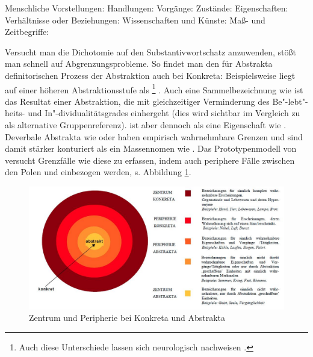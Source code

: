 \begin{exe}
	\ex \label{ex:abstrakta}
	\begin{xlist}
		\ex \label{ex:vorstellung} Menschliche Vorstellungen: 
		\ex \label{ex:handlungen} Handlungen: 
		\ex \label{ex:vorgang} Vorgänge: 
		\ex \label{ex:zustand} Zustände: 
		\ex \label{ex:eigenschaft} Eigenschaften: 
		\ex \label{ex:verhaeltnise} Verhältnisse oder Beziehungen: 
		\ex \label{ex:wissenschaft} Wissenschaften und Künste: 
		\ex \label{ex:zeit} Maß- und Zeitbegriffe: 
	\end{xlist}
\end{exe} 

Versucht man die Dichotomie  auf den Substantivwortschatz anzuwenden, stößt man schnell auf Abgrenzungsprobleme. So findet man den für Abstrakta definitorischen Prozess der Abstraktion auch bei Konkreta: Beispielsweise liegt  auf einer höheren Abstraktionsstufe als \footnote{Auch diese Unterschiede lassen sich neurologisch nachweisen \parencite[s.][]{Ghio2013}.} \parencite[274]{Ewald1992}. Auch eine Sammelbezeichnung wie  ist das Resultat einer Abstraktion, die mit gleichzeitiger Verminderung des Be"-lebt"-heits- und In"-dividualitätsgrades einhergeht (dies wird sichtbar im Vergleich zu  als alternative Gruppenreferenz).  ist aber dennoch  als eine Eigenschaft wie . Deverbale Abstrakta wie  oder  haben empirisch wahrnehmbare Grenzen und sind damit stärker konturiert als ein Massennomen wie . Das Prototypenmodell von \textcite[279f.]{Ewald1992} versucht Grenzfälle wie diese zu erfassen, indem auch periphere Fälle zwischen den Polen  und  einbezogen werden, s. Abbildung \ref{abb:schrauf-ewald}. 

\begin{figure}[h]
\begin{center}
\includegraphics[width=12cm]{images/schrauff-ewald-neu.jpg}
\caption {Zentrum und Peripherie bei Konkreta und Abstrakta \parencite[][41]{Schrauf2011}}
\label{abb:schrauf-ewald}
\end{center}
\end{figure}


